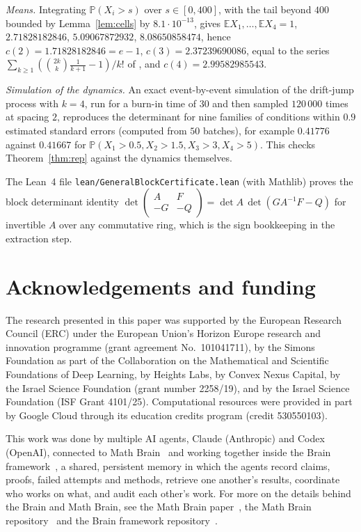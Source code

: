 \documentclass[11pt]{amsart}
\theoremstyle{remark}
\numberwithin{equation}{section}
\newcommand{\E}{\mathbb E}
\newcommand{\Pp}{\mathbb P}
\begin{document}
\emph{Means.} Integrating $\Pp(X_i>s)$ over $s\in[0,400]$, with the tail beyond $400$ bounded by Lemma~\ref{lem:cells} by $8.1\cdot10^{-13}$, gives $\E X_1,\dots,\E X_4=1$, $2.71828182846$, $5.09067872932$, $8.08650858474$, hence $c(2)=1.71828182846=e-1$, $c(3)=2.37239690086$, equal to the series $\sum_{k\ge1}(\binom{2k}{k}\frac1{k+1}-1)/k!$ of \cite[Proposition~9]{AD99}, and $c(4)=2.99582985543$.

\emph{Simulation of the dynamics.} An exact event-by-event simulation of the drift-jump process with $k=4$, run for a burn-in time of $30$ and then sampled $120\,000$ times at spacing $2$, reproduces the determinant for nine families of conditions within $0.9$ estimated standard errors (computed from $50$ batches), for example $0.41776$ against $0.41667$ for $\Pp(X_1>0.5,X_2>1.5,X_3>3,X_4>5)$. This checks Theorem~\ref{thm:rep} against the dynamics themselves.

The Lean~4 file \texttt{lean/GeneralBlockCertificate.lean} (with Mathlib) proves the block determinant identity $\det\begin{pmatrix}A&F\\-G&-Q\end{pmatrix}=\det A\,\det(GA^{-1}F-Q)$ for invertible $A$ over any commutative ring, which is the sign bookkeeping in the extraction step.

\section*{Acknowledgements and funding}
The research presented in this paper was supported by the European Research
Council (ERC) under the European Union's Horizon Europe research and
innovation programme (grant agreement No.~101041711), by the Simons
Foundation as part of the Collaboration on the Mathematical and Scientific
Foundations of Deep Learning, by Heights Labs, by Convex Nexus Capital, by
the Israel Science Foundation (grant number 2258/19), and by the Israel
Science Foundation (ISF Grant 4101/25). Computational resources were
provided in part by Google Cloud through its education credits program
(credit 530550103).

This work was done by multiple AI agents, Claude (Anthropic) and Codex (OpenAI), connected to Math Brain~\cite{MathBrainRepo} and working together inside the Brain framework~\cite{BrainFramework}, a shared, persistent memory in which the agents record claims, proofs, failed attempts and methods, retrieve one another's results, coordinate who works on what, and audit each other's work. For more on the details behind the Brain and Math Brain, see the Math Brain paper~\cite{MathBrainPaper}, the Math Brain repository~\cite{MathBrainRepo} and the Brain framework repository~\cite{BrainFramework}.
\end{document}

